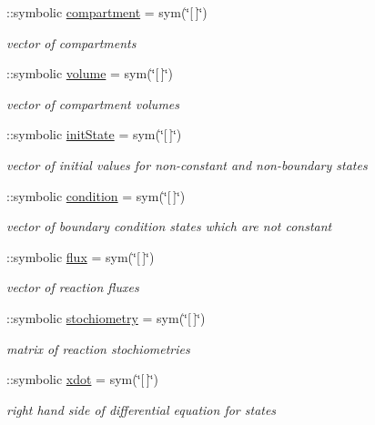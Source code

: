 \begin{DoxyCompactItemize}
\+::symbolic \hyperlink{class_s_b_m_lode_a70729d905c114f8f08b3507f20806dd2}{compartment} = sym(\char`\"{}\mbox{[}$\,$\mbox{]}\char`\"{})
\begin{DoxyCompactList}\small\item\em vector of compartments \end{DoxyCompactList}\item 
\+::symbolic \hyperlink{class_s_b_m_lode_a9bc498ccac8db41438f855f5dd3f4c05}{volume} = sym(\char`\"{}\mbox{[}$\,$\mbox{]}\char`\"{})
\begin{DoxyCompactList}\small\item\em vector of compartment volumes \end{DoxyCompactList}\item 
\+::symbolic \hyperlink{class_s_b_m_lode_a67d068407e71cba6ca16f3f6b6d1794c}{init\+State} = sym(\char`\"{}\mbox{[}$\,$\mbox{]}\char`\"{})
\begin{DoxyCompactList}\small\item\em vector of initial values for non-\/constant and non-\/boundary states \end{DoxyCompactList}\item 
\+::symbolic \hyperlink{class_s_b_m_lode_a4824b91cc0e6b5f112bdd8049af4d7d6}{condition} = sym(\char`\"{}\mbox{[}$\,$\mbox{]}\char`\"{})
\begin{DoxyCompactList}\small\item\em vector of boundary condition states which are not constant \end{DoxyCompactList}\item 
\+::symbolic \hyperlink{class_s_b_m_lode_a96d7a28b6a4428be15fc1017d19343fa}{flux} = sym(\char`\"{}\mbox{[}$\,$\mbox{]}\char`\"{})
\begin{DoxyCompactList}\small\item\em vector of reaction fluxes \end{DoxyCompactList}\item 
\+::symbolic \hyperlink{class_s_b_m_lode_a8d6dd1568c43b32f1810a5fe9ef6100f}{stochiometry} = sym(\char`\"{}\mbox{[}$\,$\mbox{]}\char`\"{})
\begin{DoxyCompactList}\small\item\em matrix of reaction stochiometries \end{DoxyCompactList}\item 
\+::symbolic \hyperlink{class_s_b_m_lode_a914ee05b8f01d45602316710ca4b8a43}{xdot} = sym(\char`\"{}\mbox{[}$\,$\mbox{]}\char`\"{})
\begin{DoxyCompactList}\small\item\em right hand side of differential equation for states \end{DoxyCompactList}\item 

\end{DoxyCompactItemize}

